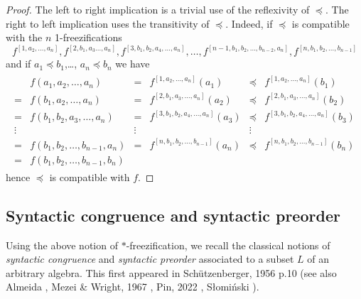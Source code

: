 \documentclass[11pt,a4paper]{article}
\theoremstyle{definition} %
\newcommand\+[1]{\mathcal{#1}} %
\DeclareMathOperator{\freez}{Frz}%
\begin{document}
\begin{proof} 
The left to right implication
is a trivial use of the reflexivity of $\preceq$. 
The right to left implication uses the transitivity of $\preceq$. 
Indeed,
if $\preceq$ is compatible with the $n$ 1-freezifications
\begin{equation*}
f^{[1,a_2,\ldots,a_{n}]},
f^{[2,b_1,a_{3}\ldots,a_{n}]},
f^{[3,b_1,b_{2},a_{4},\ldots,a_{n}]},
\ldots,
f^{[n-1,b_1,b_{2},\ldots,b_{n-2},a_{n}]},
f^{[n,b_1,b_{2},\ldots,b_{n-1}]}
\end{equation*}
and if $a_{1}\preceq b_{1}$,\ldots, $a_{n}\preceq b_{n}$
we have
\begin{align*}
\begin{array}{clclcl}
&f(a_1,a_2,\ldots,a_{n})
&=&f^{[1,a_2,\ldots,a_{n}]}(a_{1})
&\preceq& f^{[1,a_2,\ldots,a_{n}]}(b_{1})
\\
=& f(b_{1},a_2,\ldots,a_{n})
&=&f^{[2,b_{1},a_{3},\ldots,a_{n}]}(a_{2})
&\preceq& f^{[2,b_{1},a_{3},\ldots,a_{n}]}(b_{2})
\\
=& f(b_{1},b_2,a_{3},\ldots,a_{n})
&=&f^{[3,b_{1},b_{2},a_{4},\ldots,a_{n}]}(a_{3})
&\preceq& f^{[3,b_{1},b_{2},a_{4},\ldots,a_{n}]}(b_{3})
\\
\vdots& &\vdots& &\vdots&\\
=& f(b_{1},b_2,\ldots,b_{n-1},a_{n})
&=&f^{[n,b_{1},b_2,\ldots,b_{n-1}]}(a_{n})
&\preceq& f^{[n,b_{1},b_2,\ldots,b_{n-1}]}(b_{n})
\\
=& f(b_{1},b_2,\ldots,b_{n-1},b_{n})
\end{array}
\end{align*}
hence $\preceq$ is compatible with $f$. 
\end{proof}
%
%
%

\subsection{Syntactic congruence and syntactic preorder}%
\label{ss syntactic cong preorder}
Using the above notion of $*$-freezification, we recall the classical
notions of 
 {\em syntactic congruence} and {\em syntactic preorder}
 associated to a subset $L$ of an arbitrary algebra.
 This first appeared in 
Sch\"utzenberger, 1956 \cite{Schutzenberger56} p.10
(see also Almeida \cite{almeida},
Mezei \& Wright, 1967 \cite{MezeiWright67}, 
Pin, 2022 \cite{pin22}, S\l{}omi{\'n}ski \cite{Slominski74}).
 
\end{document}
